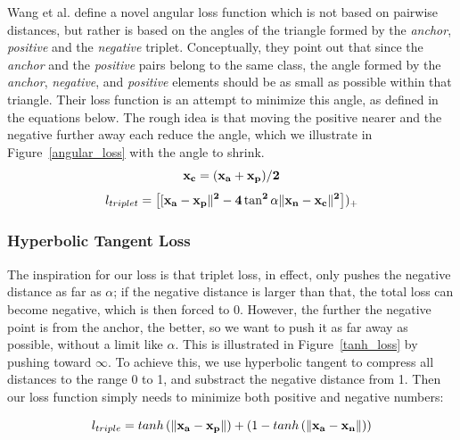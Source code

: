Wang et al. \cite{DBLP:journals/corr/abs-1708-01682} define a novel
angular loss function which is not based on pairwise distances, but
rather is based on the angles of the triangle formed by the
\textit{anchor}, \textit{positive} and the \textit{negative} triplet.
Conceptually, they point out that since the \textit{anchor} and the
\textit{positive} pairs belong to the same class, the angle formed by
the \textit{anchor}, \textit{negative}, and \textit{positive} elements
should be as small as possible within that triangle.  Their loss
function is an attempt to minimize this angle, as defined in the
equations below.  The rough idea is that moving the positive nearer
and the negative further away each reduce the angle, which we
illustrate in Figure~\ref{angular_loss} with the angle to shrink.
\begin{equation}
\bf{x_{c}} = (\bf{x_{a}} + \bf{x_{p}}) / 2
\end{equation}
\begin{equation}
l_{triplet} = \left[[\bf{x_{a}} - \bf{x_{p}}\|^2 - 4 \tan^2 \alpha \|\bf{x_{n}} - \bf{x_{c}}\|^2 \right])_{+}
\end{equation}

\subsubsection{Hyperbolic Tangent Loss}

The inspiration for our loss is that triplet loss, in effect, only
pushes the negative distance as far as $\alpha$; if the negative
distance is larger than that, the total loss can become negative,
which is then forced to 0.  However, the further the negative point is
from the anchor, the better, so we want to push it as far away as
possible, without a limit like $\alpha$.  This is illustrated in
Figure~\ref{tanh_loss} by pushing toward $\infty$.  To achieve this,
we use hyperbolic tangent to compress all distances to the range 0 to
1, and substract the negative distance from 1.  Then our loss function
simply needs to minimize both positive and negative numbers: 

 \begin{equation}
  l_{triple} =  tanh\left(\|\bf{x_a} - \bf{x_p}\|\right) + \left(1-tanh\left(\|\bf{x_a} -\bf{x_n}\|\right)\right)
\label{tanh}
\end{equation}


